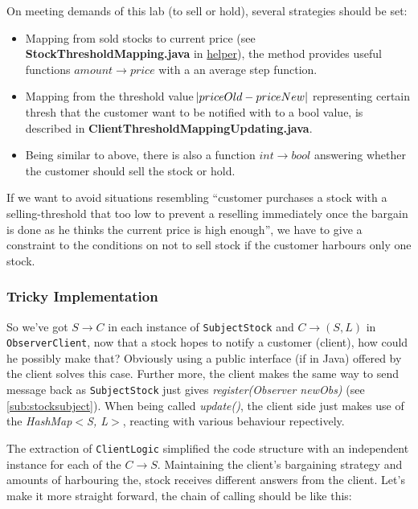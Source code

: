 \documentclass[a4paper]{article}
\begin{document}
On meeting demands of this lab (to sell or hold), several strategies should
be set:

\begin{itemize}
    \item Mapping from sold stocks to current price (see
        \textbf{StockThresholdMapping.java} in \underline{helper}),
        the method provides useful functions $amount \to price$ with a
        an average step function.
    \item Mapping from the threshold value $\abs{priceOld - priceNew}$
        representing certain thresh that the customer
        want to be notified with to a bool value, is described in
        \textbf{ClientThresholdMappingUpdating.java}.
    \item Being similar to above, there is also a function
        $int \to bool$ answering whether the customer should
        sell the stock or hold.
\end{itemize}

If we want to avoid situations resembling ``customer purchases
a stock with a selling-threshold that too low to
prevent a reselling immediately once the bargain is done as
he thinks the current price is high enough'',
we have to give a constraint to the conditions on not
to sell stock if the customer harbours only one stock.

\subsubsection{Tricky Implementation}

So we've got $S \to C$ in each instance of \texttt{SubjectStock}
and $C \to \left(S, L \right) $ in \texttt{ObserverClient}, now
that a stock hopes to notify a customer (client), how could he
possibly make that? Obviously using a public interface (if in Java)
offered by the client solves this case. Further more, the client
makes the same way to send message back as \texttt{SubjectStock} just
gives \textsl{register(Observer newObs)} (see \ref{sub:stocksubject}).
When being called \textsl{update()}, the client side just makes
use of the \textsl{HashMap$<$S, L$>$},
reacting with various behaviour repectively.

The extraction of \texttt{ClientLogic} simplified the code structure with
an independent instance for each of the $C \to S$. Maintaining the client's
bargaining strategy and amounts of harbouring the, stock receives
different answers from the client. Let's make it more straight forward,
the chain of calling should be like this:
\end{document}
